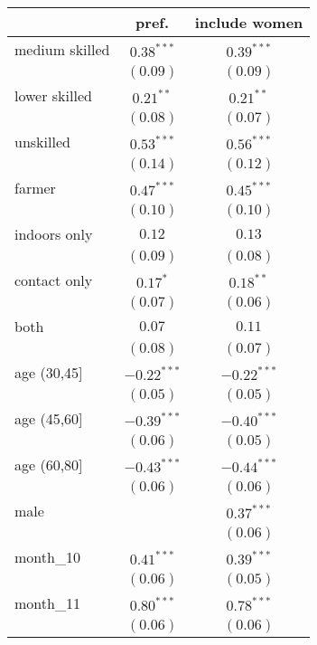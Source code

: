 
\begin{table}[h!]
\begin{center}
\begin{small}
\begin{tabular}{l c c}
\hline
 & pref. & include women \\
\hline
medium skilled & $0.38^{***}$  & $0.39^{***}$  \\
               & $(0.09)$      & $(0.09)$      \\
lower skilled  & $0.21^{**}$   & $0.21^{**}$   \\
               & $(0.08)$      & $(0.07)$      \\
unskilled      & $0.53^{***}$  & $0.56^{***}$  \\
               & $(0.14)$      & $(0.12)$      \\
farmer         & $0.47^{***}$  & $0.45^{***}$  \\
               & $(0.10)$      & $(0.10)$      \\
indoors only   & $0.12$        & $0.13$        \\
               & $(0.09)$      & $(0.08)$      \\
contact only   & $0.17^{*}$    & $0.18^{**}$   \\
               & $(0.07)$      & $(0.06)$      \\
both           & $0.07$        & $0.11$        \\
               & $(0.08)$      & $(0.07)$      \\
age (30,45]    & $-0.22^{***}$ & $-0.22^{***}$ \\
               & $(0.05)$      & $(0.05)$      \\
age (45,60]    & $-0.39^{***}$ & $-0.40^{***}$ \\
               & $(0.06)$      & $(0.05)$      \\
age (60,80]    & $-0.43^{***}$ & $-0.44^{***}$ \\
               & $(0.06)$      & $(0.06)$      \\
male           &               & $0.37^{***}$  \\
               &               & $(0.06)$      \\
month\_10      & $0.41^{***}$  & $0.39^{***}$  \\
               & $(0.06)$      & $(0.05)$      \\
month\_11      & $0.80^{***}$  & $0.78^{***}$  \\
               & $(0.06)$      & $(0.06)$      \\

\end{tabular}
\end{small}
\end{center}
\end{table}
